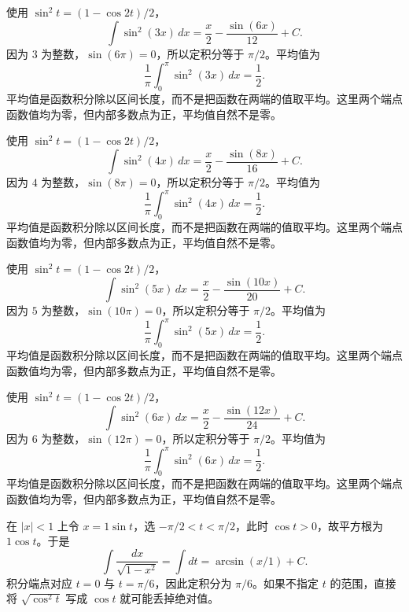 \documentclass[12pt,fontset=fandol]{ctexart}
\begin{document}
\begin{solve}\label{ans:c14q9}
使用 $\sin^2t=(1-\cos2t)/2$，
\[
\int\sin^2(3x)\,dx=\frac x2-\frac{\sin(6x)}{12}+C.
\]
因为 $3$ 为整数，$\sin(6\pi)=0$，所以定积分等于 $\pi/2$。平均值为
\[
\frac1\pi\int_0^\pi\sin^2(3x)\,dx=\frac12.
\]
平均值是函数积分除以区间长度，而不是把函数在两端的值取平均。这里两个端点函数值均为零，但内部多数点为正，平均值自然不是零。
\end{solve}

\begin{solve}\label{ans:c14q10}
使用 $\sin^2t=(1-\cos2t)/2$，
\[
\int\sin^2(4x)\,dx=\frac x2-\frac{\sin(8x)}{16}+C.
\]
因为 $4$ 为整数，$\sin(8\pi)=0$，所以定积分等于 $\pi/2$。平均值为
\[
\frac1\pi\int_0^\pi\sin^2(4x)\,dx=\frac12.
\]
平均值是函数积分除以区间长度，而不是把函数在两端的值取平均。这里两个端点函数值均为零，但内部多数点为正，平均值自然不是零。
\end{solve}

\begin{solve}\label{ans:c14q11}
使用 $\sin^2t=(1-\cos2t)/2$，
\[
\int\sin^2(5x)\,dx=\frac x2-\frac{\sin(10x)}{20}+C.
\]
因为 $5$ 为整数，$\sin(10\pi)=0$，所以定积分等于 $\pi/2$。平均值为
\[
\frac1\pi\int_0^\pi\sin^2(5x)\,dx=\frac12.
\]
平均值是函数积分除以区间长度，而不是把函数在两端的值取平均。这里两个端点函数值均为零，但内部多数点为正，平均值自然不是零。
\end{solve}

\begin{solve}\label{ans:c14q12}
使用 $\sin^2t=(1-\cos2t)/2$，
\[
\int\sin^2(6x)\,dx=\frac x2-\frac{\sin(12x)}{24}+C.
\]
因为 $6$ 为整数，$\sin(12\pi)=0$，所以定积分等于 $\pi/2$。平均值为
\[
\frac1\pi\int_0^\pi\sin^2(6x)\,dx=\frac12.
\]
平均值是函数积分除以区间长度，而不是把函数在两端的值取平均。这里两个端点函数值均为零，但内部多数点为正，平均值自然不是零。
\end{solve}

\begin{solve}\label{ans:c14q13}
在 $|x|<1$ 上令 $x=1\sin t$，选 $-\pi/2<t<\pi/2$，此时 $\cos t>0$，故平方根为 $1\cos t$。于是
\[
\int\frac{dx}{\sqrt{1-x^2}}=\int dt=\arcsin(x/1)+C.
\]
积分端点对应 $t=0$ 与 $t=\pi/6$，因此定积分为 $\pi/6$。如果不指定 $t$ 的范围，直接将 $\sqrt{\cos^2t}$ 写成 $\cos t$ 就可能丢掉绝对值。
\end{solve}
\end{document}
